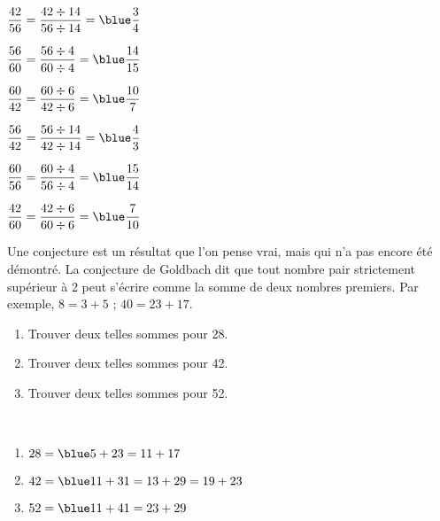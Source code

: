 \begin{colonne*exercice}
\begin{corrige}
\ \\ [-5mm]
    \begin{colenumerate}{2}
       \item $\dfrac{42}{56} =\dfrac{42\div14}{56\div14} ={\blue \dfrac{3}{4}}$ \medskip
       \item $\dfrac{56}{60} =\dfrac{56\div4}{60\div4} ={\blue \dfrac{14}{15}}$ \medskip
       \item $\dfrac{60}{42} =\dfrac{60\div6}{42\div6} ={\blue \dfrac{10}{7}}$
       \item $\dfrac{56}{42} =\dfrac{56\div14}{42\div14} ={\blue \dfrac{4}{3}}$
       \item $\dfrac{60}{56} =\dfrac{60\div4}{56\div4} ={\blue \dfrac{15}{14}}$    
       \item $\dfrac{42}{60} =\dfrac{42\div6}{60\div6} ={\blue \dfrac{7}{10}}$
   \end{colenumerate}
\end{corrige}

\bigskip



\begin{exercice}
   Une conjecture est un résultat que l'on pense vrai, mais qui n'a pas encore été démontré. La conjecture de Goldbach dit que tout nombre pair strictement supérieur à 2 peut s'écrire comme la somme de deux nombres premiers. Par exemple, $8 =3+5$ ; $40 =23+17$.
   \begin{enumerate}
      \item Trouver deux telles sommes pour 28.
      \item Trouver deux telles sommes pour 42.
      \item Trouver deux telles sommes pour 52.
   \end{enumerate}
\end{exercice}

\begin{corrige}
   \ \\ [-5mm]
   \begin{enumerate}
      \item $28 ={\blue 5+23 =11+17}$ \smallskip
      \item $42 ={\blue 11+31 =13+29 =19+23}$ \smallskip
      \item $52 ={\blue 11+41 = 23+29}$
   \end{enumerate}
\end{corrige}

\bigskip



\end{colonne*exercice}
